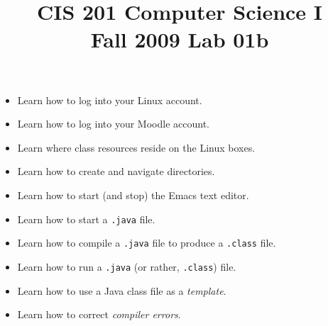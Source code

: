 \documentclass[12pt,twoside]{memoir}
\title{CIS 201 Computer Science I\\Fall 2009 Lab #1}%
\newcommand{\lab}[1]{%
\title{CIS 201 Computer Science I\\Fall 2009 Lab #1}%
\maketitle%
}
\begin{document}
\lab{01b}

{\color{templategrey}
\begin{itemize}
\item Learn how to log into your Linux account.
\item Learn how to log into your Moodle account.
\end{itemize}
}
\begin{itemize}
\item Learn where class resources reside on the Linux boxes.
\item Learn how to create and navigate directories.
\item Learn how to start (and stop) the Emacs text editor.
\item Learn how to start a \texttt{.java} file.
\item Learn how to compile a \texttt{.java} file to produce a
  \texttt{.class} file.
\item Learn how to run a \texttt{.java} (or rather, \texttt{.class}) file.
\item Learn how to use a Java class file as a \emph{template}.
\item Learn how to correct \emph{compiler errors}.
\end{itemize}
\end{document}
